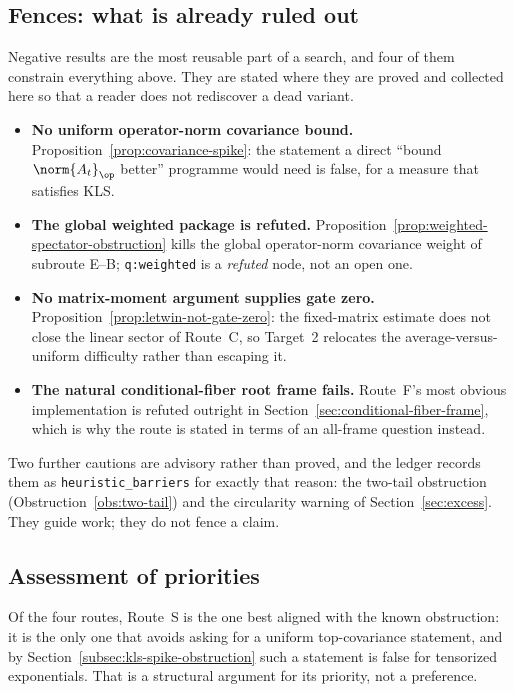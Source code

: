 \documentclass[../../main.tex]{subfiles}
\begin{document}
\subsection{Fences: what is already ruled out}
\label{subsec:atlas-fences}

Negative results are the most reusable part of a search, and four of them constrain everything
above. They are stated where they are proved and collected here so that a reader does not
rediscover a dead variant.

\begin{itemize}[leftmargin=1.6em]
  \item \textbf{No uniform operator-norm covariance bound.}
  Proposition~\ref{prop:covariance-spike}: the statement a direct ``bound $\norm{A_t}_\op$
  better'' programme would need is false, for a measure that satisfies KLS.
  \item \textbf{The global weighted package is refuted.}
  Proposition~\ref{prop:weighted-spectator-obstruction} kills the global operator-norm covariance
  weight of subroute E--B; \texttt{q:weighted} is a \emph{refuted} node, not an open one.
  \item \textbf{No matrix-moment argument supplies gate zero.}
  Proposition~\ref{prop:letwin-not-gate-zero}: the fixed-matrix estimate does not close the
  linear sector of Route~C, so Target~2 relocates the average-versus-uniform difficulty rather
  than escaping it.
  \item \textbf{The natural conditional-fiber root frame fails.} Route~F's most obvious
  implementation is refuted outright in Section~\ref{sec:conditional-fiber-frame}, which is why
  the route is stated in terms of an all-frame question instead.
\end{itemize}

Two further cautions are advisory rather than proved, and the ledger records them as
\texttt{heuristic\_barriers} for exactly that reason: the two-tail obstruction
(Obstruction~\ref{obs:two-tail}) and the circularity warning of Section~\ref{sec:excess}. They
guide work; they do not fence a claim.

\subsection{Assessment of priorities}
\label{subsec:atlas-assessment}

Of the four routes, Route~S is the one best aligned with the known obstruction: it is the only one
that avoids asking for a uniform top-covariance statement, and by
Section~\ref{subsec:kls-spike-obstruction} such a statement is false for tensorized exponentials.
That is a structural argument for its priority, not a preference.
\end{document}
